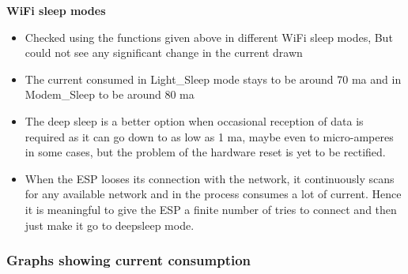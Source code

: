 \documentclass[16pt]{article}
\begin{document}
\textbf{WiFi sleep modes}

\begin{itemize}

\item
  Checked using the functions given above in different WiFi sleep modes,
  But could not see any significant change in the current drawn
\item
  The current consumed in Light\_Sleep mode stays to be around 70 ma and
  in Modem\_Sleep to be aroun\vspace{0.5cm}d 80 ma
\item
  The deep sleep is a better option when occasional reception of data is
  required as it can go down to as low as 1 ma, maybe even to
  micro-amperes in some cases, but the problem of the hardware reset is
  yet to be rectified.
\item
  When the ESP looses its connection with the network, it continuously
  scans for any available network and in the process consumes a lot of
  current. Hence it is meaningful to give the ESP a finite number of
  tries to connect and then just make it go to deepsleep mode.
\end{itemize}


\vspace{0.5cm}
\subsubsection{Graphs showing current
consumption}
\end{document}

